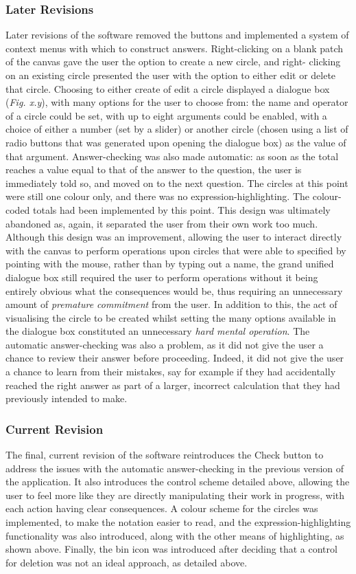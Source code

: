 \documentclass[12pt,twoside,notitlepage,xetex]{report}
\begin{document}
\subsubsection{Later Revisions}
Later revisions of the software removed the buttons and implemented a system of
context menus with which to construct answers. Right-clicking on a blank patch
of the canvas gave the user the option to create a new circle, and right-
clicking on an existing circle presented the user with the option to either
edit or delete that circle.  Choosing to either create of edit a circle
displayed a dialogue box (\emph{Fig. x.y}), with many options for the user to
choose from: the name and operator of a circle could be set, with up to eight
arguments could be enabled, with a choice of either a number (set by a slider)
or another circle (chosen using a list of radio buttons that was generated upon
opening the dialogue box) as the value of that argument.  Answer-checking was
also made automatic: as soon as the total reaches a value equal to that of the
answer to the question, the user is immediately told so, and moved on to the
next question.  The circles at this point were still one colour only, and there
was no expression-highlighting.  The colour-coded totals had been implemented by
this point.  This design was ultimately abandoned as, again, it separated the
user from their own work too much.  Although this design was an improvement,
allowing the user to interact directly with the canvas to perform operations
upon circles that were able to specified by pointing with the mouse, rather
than by typing out a name, the grand unified dialogue box still required the
user to perform operations without it being entirely obvious what the
consequences would be, thus requiring an unnecessary amount of
\emph{premature commitment} from the user.  In addition to this, the act of
visualising the circle to be created whilst setting the many options available
in the dialogue box constituted an unnecessary \emph{hard mental operation}.
The automatic answer-checking was also a problem, as it did not give the user a
chance to review their answer before proceeding.  Indeed, it did not give the
user a chance to learn from their mistakes, say for example if they had
accidentally reached the right answer as part of a larger, incorrect
calculation that they had previously intended to make.

\subsubsection{Current Revision}
The final, current revision of the software reintroduces the {\sfapp Check}
button to address the issues with the automatic answer-checking in the
previous version of the application.  It also introduces the control scheme
detailed above, allowing the user to feel more like they are directly
manipulating their work in progress, with each action having clear
consequences.  A colour scheme for the circles was implemented, to make the
notation easier to read, and the expression-highlighting functionality was also
introduced, along with the other means of highlighting, as shown above.
Finally, the bin icon was introduced after deciding that a control for deletion
was not an ideal approach, as detailed above.
\end{document}
